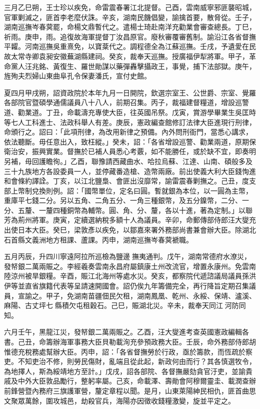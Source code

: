 \begin{pinyinscope}
三月乙巳朔，王士珍以疾免，命雷震春署江北提督。己酉，雲南威寧邪匪襲昭城，官軍剿滅之，匪首李老麼伏誅。辛亥，湖南民饑倡變，諭擒首要，散脅從。壬子，湖南巡撫岑春蓂罷，命楊文鼎暫代之。遣楊士琦赴南洋充勸業會審查總長。丁巳，祈雨。庚申，雨。追復故海軍提督丁汝昌原官。廢秋審覆審舊制。諭沿江各省督撫平糶。河南巡撫吳重熹免，以寶棻代之。調程德全為江蘇巡撫。壬戌，予遺愛在民故太常寺卿袁昶安徽蕪湖縣建祠。癸亥，裁奉天巡撫。授廣福伊犁將軍。甲子，革命黨人汪兆銘、黃復生、羅世勛謀以藥彈轟擊攝政王，事覺，捕下法部獄。庚午，旌殉夫烈婦山東曲阜孔令保妻潘氏，宣付史館。

夏四月甲戌朔，詔資政院於本年九月一日開院，欽選宗室王、公世爵、宗室、覺羅各部院官暨碩學通儒議員八十八人，前期召集。丙子，裁福建督糧道，增設巡警道、勸業道。丁丑，命載濤充專使大臣，往英國吊祭。戊寅，賞游學畢業生吳匡時等七人工科進士、法政科舉人有差。庚辰，憲政編查館修訂法律大臣進現行刑律，命頒行之。詔曰：「此項刑律，為改用新律之預備。內外問刑衙門，當悉心講求，依法聽斷。毋任意出入，致枉縱。」癸未，詔：「各省增設巡警、勸業兩道，原期保衛治安，振興實業。督撫於已補人員悉心考覈，如不能勝任，或於缺不宜，即奏明另補，毋回護瞻徇。」乙酉，聯豫請西藏曲水、哈拉烏蘇、江達、山南、碩般多及三十九族地方各設委員一人，並停藏番造槍、造幣兩廠。前出使義大利大臣錢恂進和會條約譯詮。丁亥，以江北鹽梟、會匪出沒靡常，諭雷震春剿撫之。己丑，度支部上幣制兌換則例。詔：「國幣單位，定名曰圓。暫就銀為本位，以一圓為主幣，重庫平七錢二分。另以五角、二角五分、一角三種銀幣，及五分鎳幣，二分、一分、五釐、一釐四種銅幣為輔幣。圓、角、分、釐，各以十進，著為定制。」以聯芳為荊州將軍。庚寅，定續選納稅多額十人為議員。辛卯，命郵傳部侍郎汪大燮充出使日本大臣。癸巳，梁敦彥以疾免，以鄒嘉來署外務部尚書兼會辦大臣。除湖北石首縣文義洲地方租課、蘆課。丙申，湖南巡撫岑春蓂褫職。

五月丙辰，升四川寧遠阿拉所巡檢為鹽邊撫夷通判。戊午，湖南常德府水潦災，發帑銀二萬兩賑之。李經羲奏雲南永昌府屬鎮康土州改流官，增置永康州。免雲南陸涼州被旱銀糧。辛酉，賑江北海州等處水災。癸亥，都察院代遞諮議局議員孫洪伊等並直省旗籍代表等呈請速開國會。詔仍俟九年籌備完全，再行降旨定期召集議員，宣諭之。甲子，免湖南苗疆佃民欠租，湖南鳳凰、乾州、永綏、保靖、瀘溪、麻陽、古丈坪七縣積欠屯租穀石。己巳，賑湖北災。辛未，裁奉天同江河防同知。

六月壬午，黑龍江災，發帑銀二萬兩賑之。乙酉，汪大燮進考查英國憲政編輯各書。己丑，命籌辦海軍事務大臣貝勒載洵充參預政務大臣。壬辰，命外務部侍郎胡惟德充稅務處幫辦大臣。丙申，詔：「各省督撫勞於行政，亟於籌款，而恆疏於察吏。不知吏治不修，則勞民傷財，亂端且從此起，新政何由而行？其各慎選牧令，為地擇人，斯為綏靖地方至計。」戊戌，詔各部院、各督撫嚴劾貪官汙吏，並諭貴戚及中外大臣敦品勵行，整躬率屬。己亥，命載澤、壽勛會阿穆爾靈圭、載潤查辦前鋒營暨內務府三旗護軍營，釐定章程以聞。是月，山東萊陽紳民相仇，匪首曲思文聚眾萬餘，圍攻城邑，劫殺官兵，海陽亦因徵收錢糧激變，旋並平定之。


\end{pinyinscope}
